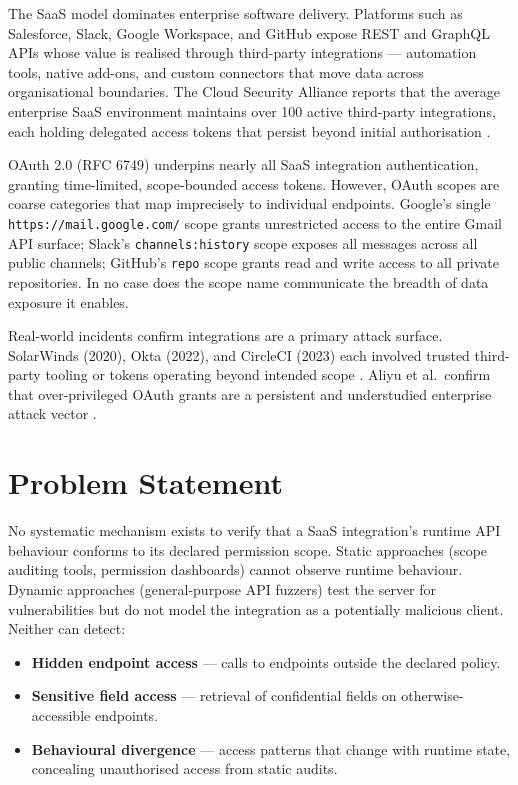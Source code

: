 \documentclass[12pt,a4paper]{report}
\begin{document}
The SaaS model dominates enterprise software delivery. Platforms such as Salesforce, Slack,
Google Workspace, and GitHub expose REST and GraphQL APIs whose value is realised through
third-party integrations --- automation tools, native add-ons, and custom connectors that move
data across organisational boundaries. The Cloud Security Alliance reports that the average
enterprise SaaS environment maintains over 100 active third-party integrations, each holding
delegated access tokens that persist beyond initial authorisation \cite{csa2023}.

OAuth 2.0 (RFC 6749) underpins nearly all SaaS integration authentication, granting
time-limited, scope-bounded access tokens. However, OAuth scopes are coarse categories that
map imprecisely to individual endpoints. Google's single \texttt{https://mail.google.com/}
scope grants unrestricted access to the entire Gmail API surface; Slack's
\texttt{channels:history} scope exposes all messages across all public channels; GitHub's
\texttt{repo} scope grants read and write access to all private repositories. In no case does
the scope name communicate the breadth of data exposure it enables.

Real-world incidents confirm integrations are a primary attack surface. SolarWinds (2020),
Okta (2022), and CircleCI (2023) each involved trusted third-party tooling or tokens operating
beyond intended scope \cite{cisa2020,okta2022,circleci2023}. Aliyu et al.\ confirm that
over-privileged OAuth grants are a persistent and understudied enterprise attack vector
\cite{aliyu2023}.

\section{Problem Statement}

No systematic mechanism exists to verify that a SaaS integration's runtime API behaviour
conforms to its declared permission scope. Static approaches (scope auditing tools, permission
dashboards) cannot observe runtime behaviour. Dynamic approaches (general-purpose API
fuzzers) test the server for vulnerabilities but do not model the integration as a potentially
malicious client. Neither can detect:

\begin{itemize}
    \item \textbf{Hidden endpoint access} --- calls to endpoints outside the declared policy.
    \item \textbf{Sensitive field access} --- retrieval of confidential fields on otherwise-accessible endpoints.
    \item \textbf{Behavioural divergence} --- access patterns that change with runtime state, concealing unauthorised access from static audits.
\end{itemize}
\end{document}
